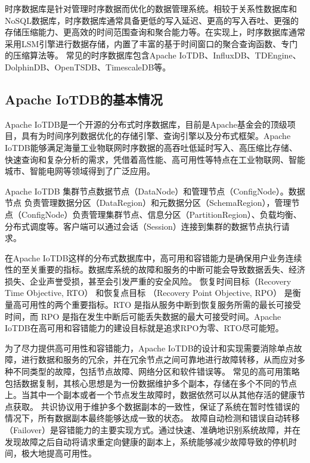 时序数据库\cite{naqvi2017timeseriesdb}是针对管理时序数据而优化的数据管理系统。相较于关系性数据库\cite{codd2007relational}和NoSQL数据库\cite{han2011surveynosql}，时序数据库通常具备更低的写入延迟、更高的写入吞吐、更强的存储压缩能力、更高效的时间范围查询和聚合能力等。在实现上，时序数据库通常采用LSM\cite{o1996lsmtree}引擎进行数据存储，内置了丰富的基于时间窗口的聚合查询函数、专门的压缩算法等。
常见的时序数据库包含Apache IoTDB\cite{wang2020iotdb}、InfluxDB\cite{shahid2019influxdb}、TDEngine\cite{tdengine_website}、DolphinDB\cite{dolphindb_website}、OpenTSDB\cite{opentsdb_website}、TimescaleDB\cite{timescale_website}等。



\subsection{Apache IoTDB的基本情况}

Apache IoTDB是一个开源的分布式时序数据库，目前是Apache基金会的顶级项目，具有为时间序列数据优化的存储引擎、查询引擎以及分布式框架。Apache IoTDB能够满足海量工业物联网时序数据的高吞吐低延时写入、高压缩比存储、快速查询和复杂分析的需求，凭借着高性能、高可用性等特点在工业物联网、智能城市、智能电网等领域得到了广泛应用。

Apache IoTDB 集群节点数据节点（DataNode）和管理节点（ConfigNode）。数据节点
负责管理数据分区（DataRegion）和元数据分区（SchemaRegion），管理节点（ConfigNode）负责管理集群节点、信息分区（PartitionRegion）、负载均衡、分布式调度等。客户端可以通过会话（Session）连接到集群的数据节点执行请求。


在Apache IoTDB这样的分布式数据库中，高可用和容错能力\cite{gray2002high}是确保用户业务连续性的至关重要的指标。数据库系统的故障和服务的中断可能会导致数据丢失、经济损失、企业声誉受损，甚至会引发严重的安全风险。
恢复时间目标（Recovery Time Objective, RTO） 和恢复点目标 （Recovery Point Objective, RPO） \cite{suguna2014overview}是衡量高可用性的两个重要指标。RTO 是指从服务中断到恢复服务所需的最长可接受时间，而 RPO 是指在发生中断后可能丢失数据的最大可接受时间。Apache IoTDB在高可用和容错能力的建设目标就是追求RPO为零、RTO尽可能短。

为了尽力提供高可用性和容错能力，Apache IoTDB的设计和实现需要消除单点故障，进行数据和服务的冗余，并在冗余节点之间可靠地进行故障转移，从而应对多种不同类型的故障，包括节点故障、网络分区和软件错误等。
常见的高可用策略包括数据复制\cite{milani2017systematic}，其核心思想是为一份数据维护多个副本，存储在多个不同的节点上。当其中一个副本或者一个节点发生故障时，数据依然可以从其他存活的健康节点获取。
共识协议用于维护多个数据副本的一致性，保证了系统在暂时性错误的情况下，所有数据副本最终能够达成一致的状态。
故障自动检测和错误自动转移（Failover）\cite{mohammed2017failover}是容错能力的主要实现方式。通过快速、准确地识别系统故障，并在发现故障之后自动将请求重定向健康的副本上，系统能够减少故障导致的停机时间，极大地提高可用性。


